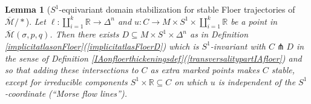 \documentclass[12pt]{article}
\newtheorem{lemma}[theorem]{Lemma}
\theoremstyle{definition}
\theoremstyle{remark}
\numberwithin{equation}{subsection}
\newcommand{\RR}{\mathbb R}
\newcommand{\Mbar}{\overline{\mathcal M}}
\begin{document}
\begin{lemma}[$S^1$-equivariant  domain stabilization for stable Floer trajectories of $\Mbar/\ast$]\label{stabilizationlemmaforHFSS}
Let $\ell:\coprod_{i=1}^k\RR\to\Delta^n$ and $u:C\to M\times S^1\times\coprod_{i=1}^k\RR$ be a point in $\Mbar(\sigma,p,q)$.  Then there exists $D\subseteq M\times S^1\times\Delta^n$ as in Definition \ref{implicitatlasonFloer}(\ref{implicitatlasFloerD}) which is $S^1$-invariant with $C\pitchfork D$ in the sense of Definition \ref{IAonfloerthickeningsdef}(\ref{transversalitypartIAfloer}) and so that adding these intersections to $C$ as extra marked points makes $C$ stable, except for irreducible components $S^1\times\RR\subseteq C$ on which $u$ is independent of the $S^1$-coordinate (``Morse flow lines'').
\end{lemma}
\end{document}
